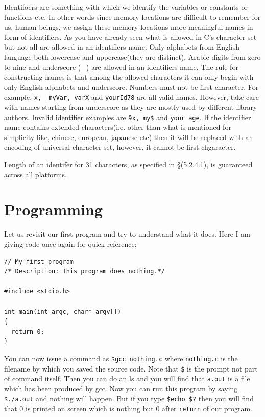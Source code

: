 Identifoers are something  with which we identify the variables or constants or
functions etc. In other words
since memory locations are difficult to remember for us, human beings, we
assign these memory locations more meaningful names in form of identifiers. As
you have already seen what is allowed  in C's character set but not all are
allowed in an identifiers name. Only alphabets from English language both
lowercase and uppercase(they are distinct),
Arabic digits from zero to nine and underscore (\_) are allowed in an
identifiers name. The rule for constructing names is that among the allowed
characters it can only begin with only English alphabets and
underscore. Numbers must not be first character. For example, \texttt{x,
  \_myVar, varX} and \texttt{yourId78} are all valid names. However, take care
with names starting from underscore as they are mostly used by different
library authors. Invalid identifier examples are \texttt{9x, my\$} and
\texttt{your age}. If the identifier name contains extended
characters(i.e. other than what is mentioned for simplicity like, chinese,
european, japanese etc) then it will be replaced with an encoding of universal
character set, however, it cannot be first chgaracter.

Length of an identifer for 31 characters, as specified in \S(5.2.4.1), is
guaranteed across all platforms.

\section{Programming}
Let us revisit our first program and try to understand what it does. Here I am 
giving code once again for quick reference:

\begin{Verbatim}[frame=single]
// My first program
/* Description: This program does nothing.*/

#include <stdio.h>

int main(int argc, char* argv[])
{
  return 0;
}
\end{Verbatim}

You can now issue a command as \texttt{\$gcc nothing.c} where 
\texttt{nothing.c} is the filename by which you saved the source code. Note 
that \texttt{\$} is the prompt not part of command itself. Then you can do an 
ls and you will find that \texttt{a.out} is a file which has been produced by 
gcc. Now you can run this program by saying \texttt{\$./a.out} and nothing 
will happen. But if you type \texttt{\$echo \$?} then you will find that 0 is 
printed on screen which is nothing but 0 after \texttt{return} of our program.

